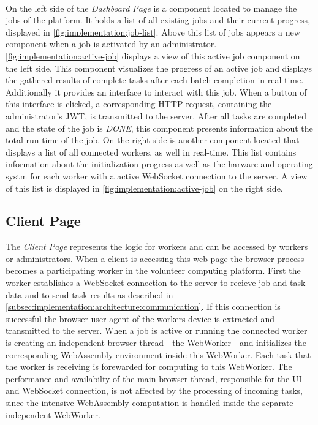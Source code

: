~\\
On the left side of the \emph{Dashboard Page} is a component located to manage the jobs of the platform. It holds a list of all existing jobs and their current progress, displayed in \autoref{fig:implementation:job-list}. Above this list of jobs appears a new component when a job is activated by an administrator. \autoref{fig:implementation:active-job} displays a view of this active job component on the left side. This component visualizes the progress of an active job and displays the gathered results of complete tasks after each batch completion in real-time. Additionally it provides an interface to interact with this job. When a button of this interface is clicked, a corresponding \acs{HTTP} request, containing the administrator's \ac{JWT}, is transmitted to the server. After all tasks are completed and the state of the job is \emph{DONE}, this component presents information about the total run time of the job. On the right side is another component located that displays a list of all connected workers, as well in real-time. This list contains information about the initialization progress as well as the harware and operating systm for each worker with a active WebSocket connection to the server. A view of this list is displayed in \autoref{fig:implementation:active-job} on the right side.

\subsection{Client Page}
\label{subsec:implementation:client-page}
The \emph{Client Page} represents the logic for workers and can be accessed by workers or administrators. When a client is accessing this web page the browser process becomes a participating worker in the volunteer computing platform. First the worker establishes a WebSocket connection to the server to recieve job and task data and to send task results as described in \autoref{subsec:implementation:architecture:communication}. If this connection is successful the browser user agent of the workers device is extracted and transmitted to the server. When a job is active or running the connected worker is creating an independent browser thread - the WebWorker - and initializes the corresponding WebAssembly environment inside this WebWorker. Each task that the worker is receiving is forewarded for computing to this WebWorker. The performance and availabilty of the main browser thread, responsible for the \ac{UI} and WebSocket connection, is not affected by the processing of incoming tasks, since the intensive WebAssembly computation is handled inside the separate independent WebWorker.


